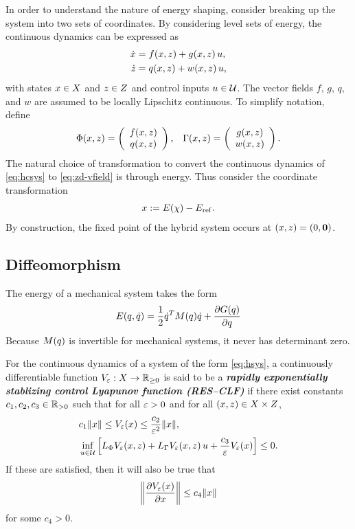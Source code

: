 \documentclass[twocolumn]{article}
\begin{document}
In order to understand the nature of energy shaping, consider breaking up the system into two sets of coordinates.
%
By considering level sets of energy, the continuous dynamics can be expressed as
\begin{align}
  \nonumber
  \dot {x} &= f(x, z) + g(x, z) \, u,\\
  \dot {z} &= q(x, z) + w(x, z) \, u,
  \label{eq:zd-vfield}
\end{align}
%
with states $x \in X$ and $z \in Z$ and control inputs $u \in \mathcal{U}$.
%
The vector fields $f$, $g$, $q$, and $w$ are assumed to be locally Lipschitz continuous.
%
To simplify notation, define
\begin{align}
  \Phi(x, z) = \left(\begin{array}{c}
    f(x, z)\\
    q(x, z)
  \end{array}\right),&&
  \Gamma (x, z) = \left(\begin{array}{c}
    g(x, z)\\
    w(x, z)
  \end{array}\right).
\end{align}
%
The natural choice of transformation to convert the continuous dynamics of \eqref{eq:hcsys} to \eqref{eq:zd-vfield} is through energy.
%
Thus consider the coordinate transformation
\begin{align}
  x := E(\chi) - E_{\mathrm{ref}}.
\end{align}
By construction, the fixed point of the hybrid system occurs at $(x, z) = (0, {\mathbf 0})$.
%

\subsection{Diffeomorphism}
The energy of a mechanical system takes the form
\begin{align}
  E(q, \dot{q}) = \frac{1}{2} \dot{q}^{T} M(q) \dot{q} + \frac{\partial{G(q)}}{\partial{q}}
\end{align}
Because $M(q)$ is invertible for mechanical systems, it never has determinant zero.

\begin{definition}
  For the continuous dynamics of a system of the form \eqref{eq:hsys}, a continuously differentiable function $V_{\varepsilon} : X \to \mathbb{R}_{\geq 0}$ is said to be a {\bf \em rapidly exponentially stablizing control Lyapunov function (RES--CLF)} if there exist constants $c_{1}, c_{2}, c_{3} \in \mathbb{R}_{> 0}$ such that for all $\varepsilon > 0$ and for all $(x, z) \in X \times Z$,
  \begin{align}
    &c_{1} \|x\| \leq V_{\varepsilon}(x) \leq \frac{c_{2}}{\varepsilon^{2}} \|x\|,\\
    \nonumber
    &\inf_{u \in \mathcal{U}} \left[ L_{\Phi} V_{\varepsilon}(x, z) + L_{\Gamma} V_{\varepsilon}(x, z) \, u + \frac{c_{3}}{\varepsilon} V_{\varepsilon}(x) \right] \leq 0.
  \end{align}
  If these are satisfied, then it will also be true that
  \begin{align}
    \label{eq:dVedx-bounds}
    \left\| \frac{\partial{V_{\varepsilon}(x)}}{\partial{x}} \right\| \leq c_{4} \| x \|
  \end{align}
  for some $c_{4} > 0$.
\end{definition}
\end{document}
